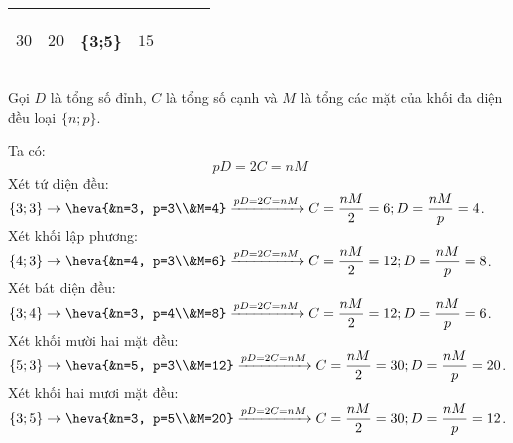 \begin{longtable}[c]{|c|l|l|l|l|>{\centering}p{1cm}|>{\centering}p{1cm}|}
\begin{minipage}[c]{1cm}%
	\begin{center}
		$30$
		\par\end{center}%
\end{minipage}  & %
\begin{minipage}[c]{1cm}%
	\begin{center}
		$20$
		\par\end{center}%
\end{minipage}  & %
\begin{minipage}[c]{0.2cm}%
	\begin{center}
		\{3;5\}
		\par\end{center}%
\end{minipage} &%
\begin{minipage}[c]{1cm}%
	\begin{center}
		$15$
		\par\end{center}%
\end{minipage}  \tabularnewline
\hline 
\end{longtable}
\begin{note}
	Gọi $D$ là tổng số đỉnh, $C$ là tổng số cạnh và $M$ là tổng các mặt của khối đa diện đều loại $\{n;p\}$.
\end{note}
Ta có: \[pD=2C=nM\]
Xét tứ diện đều:\\
$\{3;3\}\to\heva{&n=3, p=3\\&M=4}\xrightarrow{{pD=2C=nM}}C=\dfrac{nM}{2}=6;D=\dfrac{nM}{p}=4$.\\
Xét khối lập phương:\\
 $\{4;3\}\to\heva{&n=4, p=3\\&M=6}\xrightarrow{{pD=2C=nM}}C=\dfrac{nM}{2}=12;D=\dfrac{nM}{p}=8$.\\
Xét bát diện đều:\\
 $\{3;4\}\to\heva{&n=3, p=4\\&M=8}\xrightarrow{pD=2C=nM}C=\dfrac{nM}{2}=12;D=\dfrac{nM}{p}=6$.\\
Xét khối mười hai mặt đều:\\
 $\{5;3\}\to\heva{&n=5, p=3\\&M=12}\xrightarrow{{pD=2C=nM}}C=\dfrac{nM}{2}=30;D=\dfrac{nM}{p}=20$.\\
Xét khối hai mươi mặt đều:\\
 $\{3;5\}\to\heva{&n=3, p=5\\&M=20}\xrightarrow{{pD=2C=nM}}C=\dfrac{nM}{2}=30;D=\dfrac{nM}{p}=12$.\\
